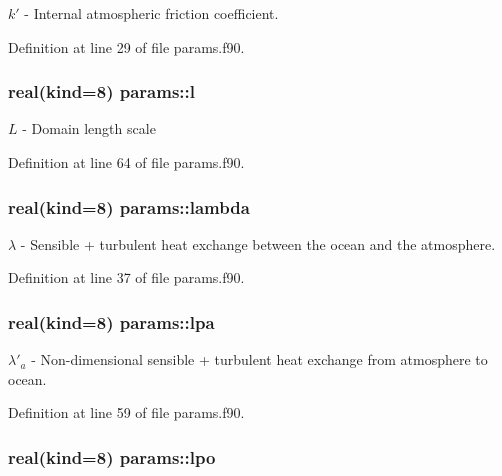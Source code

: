$k'$ -\/ Internal atmospheric friction coefficient. 



Definition at line 29 of file params.\-f90.

\hypertarget{classparams_aa2b032a17c85d2069ca59212ad8309a1}{
\subsubsection[{l}]{\setlength{\rightskip}{0pt plus 5cm}real(kind=8) params\-::l}}\label{classparams_aa2b032a17c85d2069ca59212ad8309a1}


$L$ -\/ Domain length scale 



Definition at line 64 of file params.\-f90.

\hypertarget{classparams_a022da5c60234624dcc3d76382a7382da}{
\subsubsection[{lambda}]{\setlength{\rightskip}{0pt plus 5cm}real(kind=8) params\-::lambda}}\label{classparams_a022da5c60234624dcc3d76382a7382da}


$\lambda$ -\/ Sensible + turbulent heat exchange between the ocean and the atmosphere. 



Definition at line 37 of file params.\-f90.

\hypertarget{classparams_abc64b12ee840e1d848729ea868221117}{
\subsubsection[{lpa}]{\setlength{\rightskip}{0pt plus 5cm}real(kind=8) params\-::lpa}}\label{classparams_abc64b12ee840e1d848729ea868221117}


$\lambda'_a$ -\/ Non-\/dimensional sensible + turbulent heat exchange from atmosphere to ocean. 



Definition at line 59 of file params.\-f90.

\hypertarget{classparams_aa668795ed0785dc42a43980c82ba058e}{
\subsubsection[{lpo}]{\setlength{\rightskip}{0pt plus 5cm}real(kind=8) params\-::lpo}}\label{classparams_aa668795ed0785dc42a43980c82ba058e}


